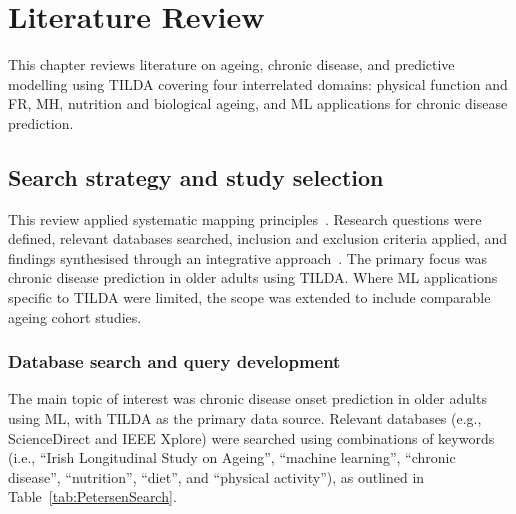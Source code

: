 

\chapter{Literature Review}\label{ch:chapter2} %


\ifpdf
    \graphicspath{{2_chapter2/figures/PNG/}{2_chapter2/figures/PDF/}{2_chapter2/figures/}}
\else
    \graphicspath{{2_chapter2/figures/EPS/}{2_chapter2/figures/}}
\fi

This chapter reviews literature on ageing, chronic disease, and predictive modelling using \gls{TILDA} covering four interrelated domains: physical function and \gls{FR}, \gls{MH}, nutrition and biological ageing, and \gls{ML} applications for chronic disease prediction.

\section{Search strategy and study selection}
This review applied systematic mapping principles~\cite{petersenGuidelinesConductingSystematic2015}. Research questions were defined, relevant databases searched, inclusion and exclusion criteria applied, and findings synthesised through an integrative approach~\cite{torracoWritingIntegrativeLiterature2005,kitchenhamSystematicLiteratureReviews2009a}. The primary focus was chronic disease prediction in older adults using \gls{TILDA}. Where \gls{ML} applications specific to \gls{TILDA} were limited, the scope was extended to include comparable ageing cohort studies.

\subsection{Database search and query development}
The main topic of interest was chronic disease onset prediction in older adults using \gls{ML}, with \gls{TILDA} as the primary data source. Relevant databases (e.g., ScienceDirect and IEEE Xplore) were searched using combinations of keywords (i.e., ``Irish Longitudinal Study on Ageing'', ``machine learning'', ``chronic disease'', ``nutrition'', ``diet'', and ``physical activity''), as outlined in Table~\ref{tab:PetersenSearch}. 

